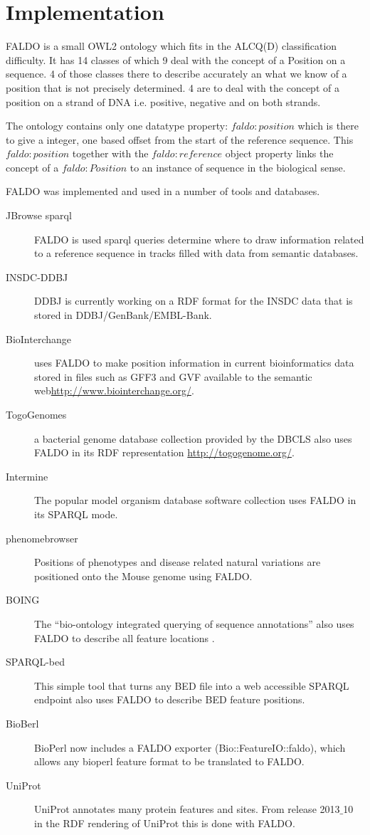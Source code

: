\section*{Implementation}

FALDO is a small OWL2 ontology which fits in the ALCQ(D) classification difficulty.
It has 14 classes of which 9 deal with the concept of a Position on a sequence. 
4 of those classes there to describe accurately an what we know of a position that is not precisely determined. 
4 are to deal with the concept of a position on a strand of DNA i.e. positive, negative and on both strands.

The ontology contains only one datatype property: $faldo:position$ which is there to give a integer, one based offset from 
the start of the reference sequence. This $faldo:position$ together with the $faldo:reference$ object property links the concept
of a $faldo:Position$ to an instance of sequence in the biological sense.





FALDO was implemented and used in a number of tools and databases.

\begin{description}
\item[JBrowse sparql] FALDO is used sparql queries determine where to draw information related to a reference sequence in tracks filled with data from semantic databases. 
\item[INSDC-DDBJ] DDBJ is currently working on a RDF format for the INSDC data that is stored in DDBJ/GenBank/EMBL-Bank.
\item[BioInterchange] uses FALDO to make position information in current bioinformatics data stored in files such as GFF3 and GVF available to the semantic web\url{http://www.biointerchange.org/}.
\item[TogoGenomes] a bacterial genome database collection provided by the DBCLS also uses FALDO in its RDF representation \url{http://togogenome.org/}.
\item[Intermine] The popular model organism database software collection uses FALDO in its SPARQL mode.
\item[phenomebrowser] Positions of phenotypes and disease related natural variations are positioned onto the Mouse genome using FALDO.
\item[BOING] The ``bio-ontology integrated querying of sequence annotations'' also uses FALDO to describe all feature locations \cite{BOING}.
\item[SPARQL-bed] This simple tool that turns any BED file into a web accessible SPARQL endpoint also uses FALDO to describe BED feature positions.
\item[BioBerl] BioPerl\cite{BioPerl2002} now includes a FALDO exporter (Bio::FeatureIO::faldo), which allows any bioperl feature format to be translated to FALDO.
\item[UniProt] UniProt annotates many protein features and sites. From release 2013$\_$10 in the RDF rendering of UniProt this is done with FALDO.
\end{description}




